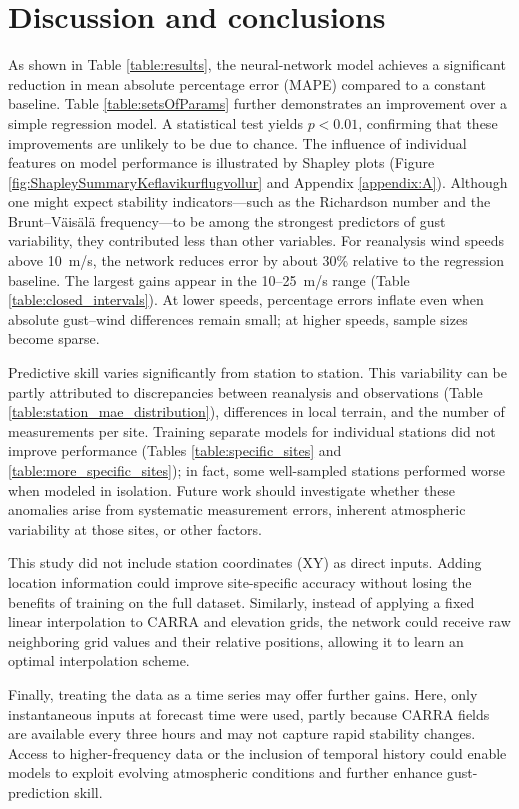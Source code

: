 \chapter{Discussion and conclusions}
\label{Chapter5}
As shown in Table \ref{table:results}, the neural-network model achieves a significant reduction in mean absolute percentage error (MAPE) compared to a constant baseline. Table \ref{table:setsOfParams} further demonstrates an improvement over a simple regression model. A statistical test yields $p<0.01$, confirming that these improvements are unlikely to be due to chance. The influence of individual features on model performance is illustrated by Shapley plots (Figure \ref{fig:ShapleySummaryKeflavikurflugvollur} and Appendix \ref{appendix:A}). Although one might expect stability indicators—such as the Richardson number and the Brunt--Väisälä frequency—to be among the strongest predictors of gust variability, they contributed less than other variables. For reanalysis wind speeds above 10~m/s, the network reduces error by about 30\% relative to the regression baseline. The largest gains appear in the 10--25~m/s range (Table \ref{table:closed_intervals}). At lower speeds, percentage errors inflate even when absolute gust--wind differences remain small; at higher speeds, sample sizes become sparse.

Predictive skill varies significantly from station to station. This variability can be partly attributed to discrepancies between reanalysis and observations (Table \ref{table:station_mae_distribution}), differences in local terrain, and the number of measurements per site. Training separate models for individual stations did not improve performance (Tables \ref{table:specific_sites} and \ref{table:more_specific_sites}); in fact, some well-sampled stations performed worse when modeled in isolation. Future work should investigate whether these anomalies arise from systematic measurement errors, inherent atmospheric variability at those sites, or other factors.

This study did not include station coordinates (XY) as direct inputs. Adding location information could improve site-specific accuracy without losing the benefits of training on the full dataset. Similarly, instead of applying a fixed linear interpolation to CARRA and elevation grids, the network could receive raw neighboring grid values and their relative positions, allowing it to learn an optimal interpolation scheme.

Finally, treating the data as a time series may offer further gains. Here, only instantaneous inputs at forecast time were used, partly because CARRA fields are available every three hours and may not capture rapid stability changes. Access to higher-frequency data or the inclusion of temporal history could enable models to exploit evolving atmospheric conditions and further enhance gust-prediction skill.
